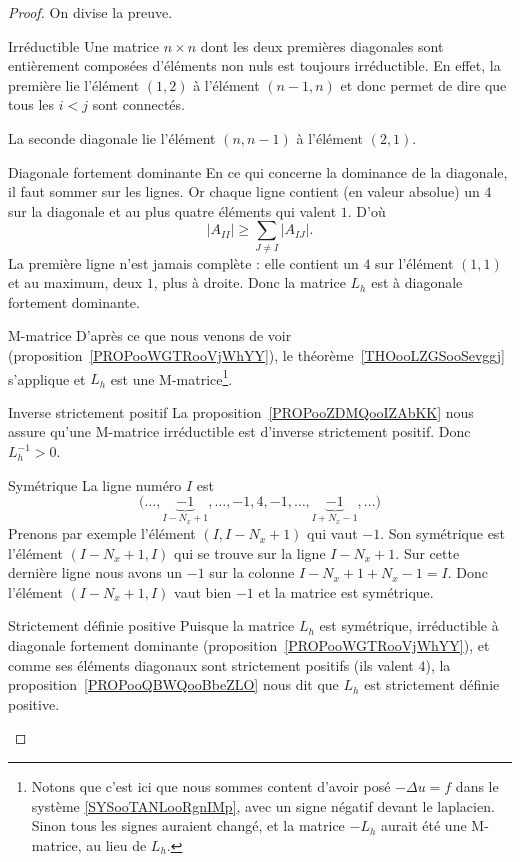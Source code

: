\begin{proof}
	On divise la preuve.
	\begin{subproof}
		\item[Irréductible]
		Une matrice \( n\times n\) dont les deux premières diagonales sont entièrement composées d'éléments non nuls est toujours irréductible. En effet, la première lie l'élément \( (1,2)\) à l'élément \( (n-1,n)\) et donc permet de dire que tous les \( i<j\) sont connectés.

		La seconde diagonale lie l'élément \( (n,n-1)\) à l'élément \( (2,1)\).

		\item[Diagonale fortement dominante]
		En ce qui concerne la dominance de la diagonale, il faut sommer sur les lignes. Or chaque ligne contient (en valeur absolue) un \( 4\) sur la diagonale et au plus quatre éléments qui valent \( 1\). D'où
		\begin{equation}
			| A_{II} |\geq \sum_{J\neq I}| A_{IJ} |.
		\end{equation}
		La première ligne n'est jamais complète : elle contient un \( 4\) sur l'élément \( (1,1)\) et au maximum, deux \( 1\), plus à droite. Donc la matrice \( L_h\) est à diagonale fortement dominante.

		\item[M-matrice]
		D'après ce que nous venons de voir (proposition~\ref{PROPooWGTRooVjWhYY}), le théorème~\ref{THOooLZGSooSevggj} s'applique et \( L_h\) est une M-matrice\footnote{Notons que c'est ici que nous sommes content d'avoir posé \( -\Delta u=f\) dans le système \eqref{SYSooTANLooRgnIMp}, avec un signe négatif devant le laplacien. Sinon tous les signes auraient changé, et la matrice \( -L_h\) aurait été une M-matrice, au lieu de \( L_h\).}.

		\item[Inverse strictement positif]
		La proposition~\ref{PROPooZDMQooIZAbKK} nous assure qu'une M-matrice irréductible est d'inverse strictement positif. Donc \( L_h^{-1}>0\).

		\item[Symétrique]
		La ligne numéro \( I\) est
		\begin{equation}
			\big( \ldots ,\underbrace{-1}_{I-N_x+1},\ldots,-1,4,-1,\ldots,\underbrace{-1}_{I+N_x-1},\ldots \big)
		\end{equation}
		Prenons par exemple l'élément \( (I,I-N_x+1)\) qui vaut \( -1\). Son symétrique est l'élément \( (I-N_x+1,I)\) qui se trouve sur la ligne \( I-N_x+1\). Sur cette dernière ligne nous avons un \( -1\) sur la colonne \( I-N_x+1+N_x-1=I\). Donc l'élément \( (I-N_x+1,I)\) vaut bien \( -1\) et la matrice est symétrique.

		\item[Strictement définie positive]
		Puisque la matrice \( L_h\) est symétrique, irréductible à diagonale fortement dominante (proposition~\ref{PROPooWGTRooVjWhYY}), et comme ses éléments diagonaux sont strictement positifs (ils valent \( 4\)), la proposition~\ref{PROPooQBWQooBbeZLO} nous dit que \( L_h\) est strictement définie positive.
	\end{subproof}
\end{proof}

